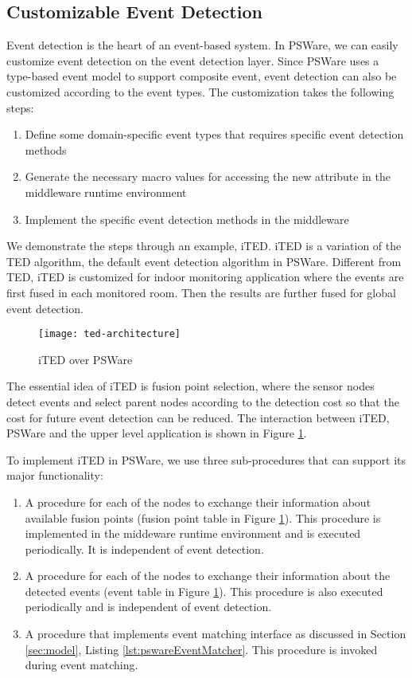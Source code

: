\subsection{Customizable Event Detection}
Event detection is the heart of an event-based system. In PSWare, we can easily customize event detection on the event detection layer. Since PSWare uses a type-based event model to support composite event, event detection can also be customized according to the event types. The customization takes the following steps:
\begin{enumerate}
\item Define some domain-specific event types that requires specific event detection methods
\item Generate the necessary macro values for accessing the new attribute in the middleware runtime environment
\item Implement the specific event detection methods in the middleware
\end{enumerate}

We demonstrate the steps through an example, iTED. iTED is a variation of the TED \cite{lai:ted} algorithm, the default event detection algorithm in PSWare. Different from TED, iTED is customized for indoor monitoring application where the events are first fused in each monitored room. Then the results are further fused for global event detection.

\begin{figure}
\centering
\texttt{[image: ted-architecture]}
\caption{iTED over PSWare}
\label{fig:ted-architecture}
\end{figure}

The essential idea of iTED is fusion point selection, where the sensor nodes detect events and select parent nodes according to the detection cost so that the cost for future event detection can be reduced. The interaction between iTED, PSWare and the upper level application is shown in Figure \ref{fig:ted-architecture}.

To implement iTED in PSWare, we use three sub-procedures that can support its major functionality:
\begin{enumerate}
\item A procedure for each of the nodes to exchange their information about available fusion points (fusion point table in Figure \ref{fig:ted-architecture}). This procedure is implemented in the middeware runtime environment and is executed periodically. It is independent of event detection.
\item A procedure for each of the nodes to exchange their information about the detected events (event table in Figure \ref{fig:ted-architecture}). This procedure is also executed periodically and is independent of event detection.
\item A procedure that implements event matching interface as discussed in Section \ref{sec:model}, Listing \ref{lst:pswareEventMatcher}. This procedure is invoked during event matching.
\end{enumerate}

